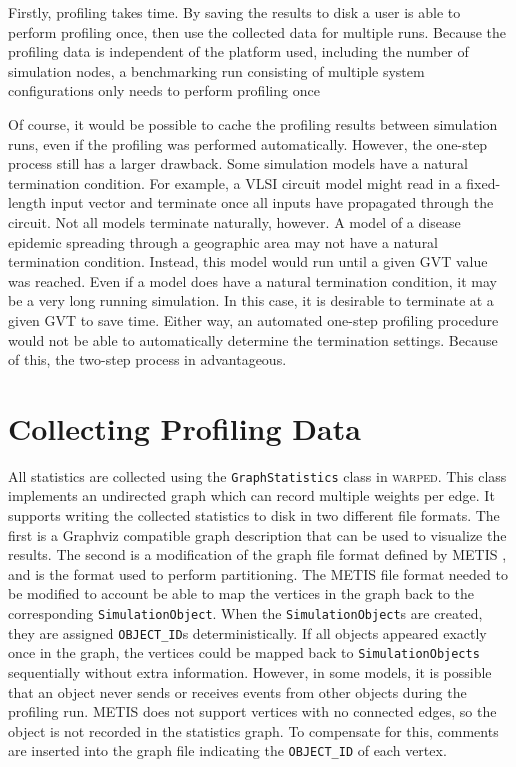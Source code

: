 \documentclass[11pt]{book}
\begin{document}
Firstly, profiling takes time. By saving the results to disk a user is able to perform profiling once, then use the collected data for multiple runs. Because the profiling data is independent of the platform used, including the number of simulation nodes, a benchmarking run consisting of multiple system configurations only needs to perform profiling once

Of course, it would be possible to cache the profiling results between simulation runs, even if the profiling was performed automatically. However, the one-step process still has a larger drawback. Some simulation models have a natural termination condition. For example, a VLSI circuit model might read in a fixed-length input vector and terminate once all inputs have propagated through the circuit. Not all models terminate naturally, however. A model of a disease epidemic spreading through a geographic area may not have a natural termination condition. Instead, this model would run until a given GVT value was reached. Even if a model does have a natural termination condition, it may be a very long running simulation. In this case, it is desirable to terminate at a given GVT to save time. Either way, an automated one-step profiling procedure would not be able to automatically determine the termination settings. Because of this, the two-step process in advantageous.

\section{Collecting Profiling Data}\label{sec:collectingProfilingData}

All statistics are collected using the \texttt{GraphStatistics} class in \textsc{warped}. This class implements an undirected graph which can record multiple weights per edge. It supports writing the collected statistics to disk in two different file formats. The first is a Graphviz compatible graph description that can be used to visualize the results. The second is a modification of the graph file format defined by METIS \cite{karypis-11}, and is the format used to perform partitioning. The METIS file format needed to be modified to account be able to map the vertices in the graph back to the corresponding \texttt{SimulationObject}. When the \texttt{SimulationObject}s are created, they are assigned \texttt{OBJECT\_ID}s deterministically. If all objects appeared exactly once in the graph, the vertices could be mapped back to \texttt{SimulationObjects} sequentially without extra information. However, in some models, it is possible that an object never sends or receives events from other objects during the profiling run. METIS does not support vertices with no connected edges, so the object is not recorded in the statistics graph. To compensate for this, comments are inserted into the graph file indicating the \texttt{OBJECT\_ID} of each vertex.
\end{document}
